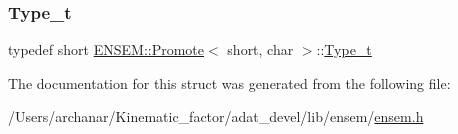 \subsubsection{\texorpdfstring{Type\_t}{Type\_t}\hspace{0.1cm}{\footnotesize\ttfamily [2/2]}}
{\footnotesize\ttfamily typedef short \mbox{\hyperlink{structENSEM_1_1Promote}{E\+N\+S\+E\+M\+::\+Promote}}$<$ short, char $>$\+::\mbox{\hyperlink{structENSEM_1_1Promote_3_01short_00_01char_01_4_a17ccbda3b4c4ad881634810abd3eb2dc}{Type\+\_\+t}}}



The documentation for this struct was generated from the following file\+:\begin{DoxyCompactItemize}
\item 
/\+Users/archanar/\+Kinematic\+\_\+factor/adat\+\_\+devel/lib/ensem/\mbox{\hyperlink{lib_2ensem_2ensem_8h}{ensem.\+h}}\end{DoxyCompactItemize}
